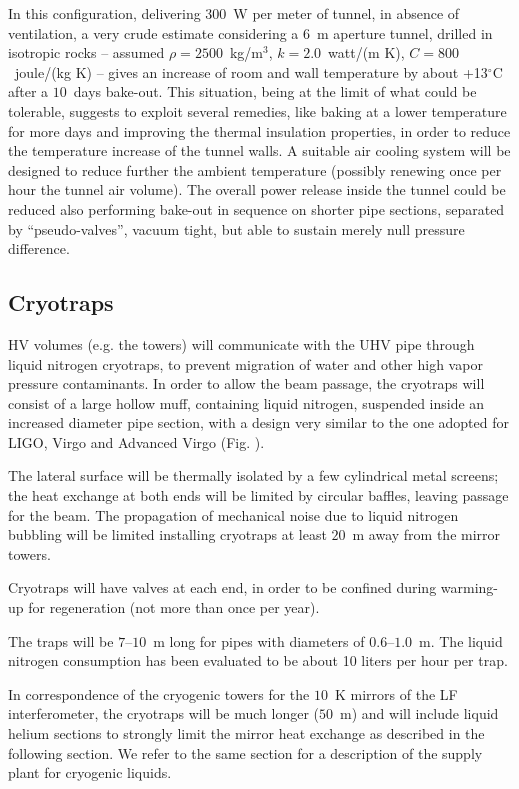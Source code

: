 In this configuration, delivering $300$~W per meter of tunnel, in absence of ventilation, a very crude estimate considering a $6$~m aperture tunnel, drilled in isotropic rocks -- assumed $\rho = 2500$~kg/m$^{3}$, $k = 2.0$~watt/(m K), $C = 800$~joule/(kg K) -- gives an increase of room and wall temperature by about +13$^{\circ}$C after a $10$~days bake-out. This situation, being at the limit of what could be tolerable, suggests to exploit several remedies, like baking at a lower temperature for more days and improving the thermal insulation properties, in order to reduce the temperature increase of the tunnel walls. A suitable air cooling system will be designed to reduce further the ambient temperature (possibly renewing once per hour the tunnel air volume). The overall power release inside the tunnel could be reduced also performing bake-out in sequence on shorter pipe sections, separated by ``pseudo-valves'', vacuum tight, but able to sustain merely null pressure difference.

\subsection{Cryotraps} 
HV volumes (e.g. the towers) will communicate with the UHV pipe through liquid nitrogen cryotraps, to prevent migration of water and other high vapor pressure contaminants. In order to allow the beam passage, the cryotraps will consist of a large hollow muff, containing liquid nitrogen, suspended inside an increased diameter pipe section, with a design very similar to the one adopted for LIGO, Virgo and Advanced Virgo (Fig. %
). 

The lateral surface will be thermally isolated by a few cylindrical metal screens; the heat exchange at both ends will be limited by circular baffles, leaving passage for the beam. The propagation of mechanical noise due to liquid nitrogen bubbling will be limited installing cryotraps at least $20$~m away from the mirror towers. 

Cryotraps will have valves at each end, in order to be confined during warming-up for regeneration (not more than once per year). 

The traps will be $7$--$10$~m long for pipes with diameters of $0.6$--$1.0$~m. The liquid nitrogen consumption has been evaluated to be about 10 liters per hour per trap. 

In correspondence of the cryogenic towers for the $10$~K mirrors of the LF interferometer, the cryotraps will be much longer ($50$~m) and will include liquid helium sections to strongly limit the mirror heat exchange as described in the following section. We refer to the same section for a description of the supply plant for cryogenic liquids. 

